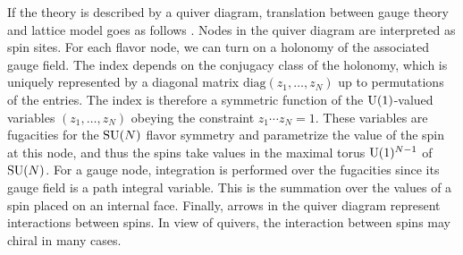 If the theory is described by a quiver diagram, translation between gauge
theory and lattice model goes as follows \cite{Yamazaki:2012cp,Yamazaki:2013nra}.
Nodes in the quiver diagram are interpreted as spin sites. For each flavor node, we can
turn on a holonomy of the associated gauge field. The index depends
on the conjugacy class of the holonomy, which is uniquely represented
by a diagonal matrix $\mathrm{diag}(z_{1},\ldots,z_{N})$ up to permutations
of the entries. The index is therefore a symmetric function of the
$\mathrm{U}(1)$-valued variables $(z_{1},\ldots,z_{N})$ obeying the constraint
$z_{1}\cdots z_{N}=1$. These variables are fugacities for the $\mathrm{SU}(N)$
flavor symmetry and parametrize the value of the spin at this node,
and thus the spins take values in the maximal torus $\mathrm{U}(1)^{N-1}$
of $\mathrm{SU}(N)$. For a gauge node, integration is performed over the fugacities
since its gauge field is a path integral variable. This is the summation
over the values of a spin placed on an internal face. Finally, arrows in the quiver diagram
represent interactions between spins.
In view of quivers, the interaction between spins may chiral in many cases.

